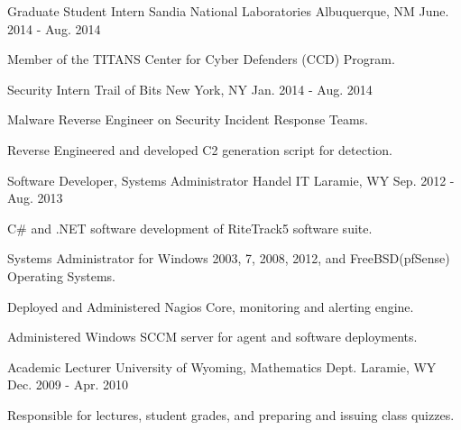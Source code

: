 \begin{cventries}

\cventry
{Graduate Student Intern} %
{Sandia National Laboratories} %
{Albuquerque, NM} %
{June. 2014 - Aug. 2014} %
{ %
\begin{cvitems}
\item {Member of the TITANS Center for Cyber Defenders (CCD) Program.}
\end{cvitems}
}


\cventry
{Security Intern} %
{Trail of Bits} %
{New York, NY} %
{Jan. 2014 - Aug. 2014} %
{ %
\begin{cvitems}
\item {Malware Reverse Engineer on Security Incident Response Teams.}
\item {Reverse Engineered and developed C2 generation script for detection.}
\end{cvitems}
}


\cventry
{Software Developer, Systems Administrator} %
{Handel IT} %
{Laramie, WY} %
{Sep. 2012 - Aug. 2013} %
{ %
\begin{cvitems}
\item {C# and .NET software development of RiteTrack5 software suite.}
\item {Systems Administrator for Windows 2003, 7, 2008, 2012, and FreeBSD(pfSense) Operating Systems.}
\item {Deployed and Administered Nagios Core, monitoring and alerting engine.}
\item {Administered Windows SCCM server for agent and software deployments.}
\end{cvitems} 
}


\cventry
{Academic Lecturer} %
{University of Wyoming, Mathematics Dept.} %
{Laramie, WY} %
{Dec. 2009 - Apr. 2010} %
{ %
\begin{cvitems}
\item {Responsible for lectures, student grades, and preparing and issuing class quizzes.}
\end{cvitems}
}


\end{cventries}
